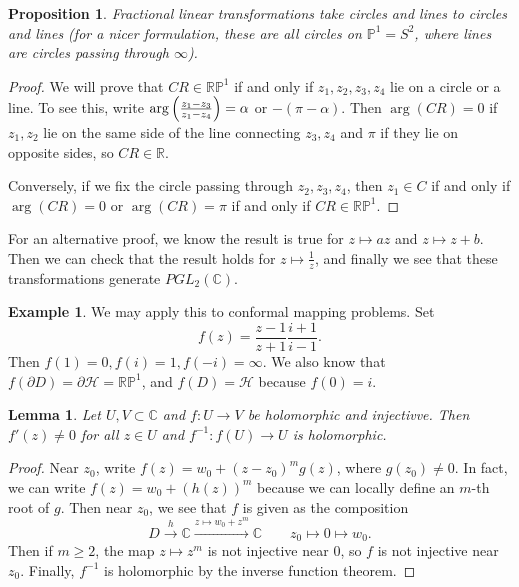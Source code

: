 \documentclass[leqno, openany]{memoir}
\newtheorem{prop}[thm]{Proposition}
\newtheorem{lem}[thm]{Lemma}
\theoremstyle{definition}
\newtheorem{exm}[thm]{Example}
\theoremstyle{remark}
\theoremstyle{plain}
\theoremstyle{definition}
\theoremstyle{remark}
\newcommand{\R}{\mathbb{R}}
\newcommand{\C}{\mathbb{C}}
\renewcommand{\P}{\mathbb{P}}
\newcommand{\mc}[1]{\mathcal{#1}}
\begin{document}
\begin{prop}
    Fractional linear transformations take circles and lines to circles and lines (for a nicer formulation, these are all circles on $\P^1 = S^2$, where lines are circles passing through $\infty$).
\end{prop}

\begin{proof}
    We will prove that $CR \in \R \P^1$ if and only if $z_1, z_2, z_3, z_4$ lie on a circle or a line. To see this, write $\arg\qty(\frac{z_1-z_3}{z_1-z_4}) = \alpha$ or $-(\pi-\alpha)$. Then $\arg(CR) = 0$ if $z_1, z_2$ lie on the same side of the line connecting $z_3, z_4$ and $\pi$ if they lie on opposite sides, so $CR \in \R$. 

    Conversely, if we fix the circle passing through $z_2, z_3, z_4$, then $z_1 \in C$ if and only if $\arg(CR) = 0$ or $\arg(CR) = \pi$ if and only if $CR \in \R\P^1$.
\end{proof}

For an alternative proof, we know the result is true for $z \mapsto az$ and $z \mapsto z + b$. Then we can check that the result holds for $z \mapsto \frac{1}{z}$, and finally we see that these transformations generate $PGL_2(\C)$.

\begin{exm}
    We may apply this to conformal mapping problems. Set 
    \[ f(z) = \frac{z-1}{z+1} \frac{i+1}{i-1}. \]
    Then $f(1) = 0, f(i) = 1, f(-i) = \infty$. We also know that $f(\partial D) = \partial \mc{H} = \R\P^1$, and $f(D) = \mc{H}$ because $f(0) = i$.
\end{exm}

\begin{lem}
    Let $U, V \subset \C$ and $f \colon U \to V$ be holomorphic and injectivve. Then $f'(z) \neq 0$ for all $z \in U$ and $f^{-1} \colon f(U) \to U$ is holomorphic.
\end{lem}

\begin{proof}
    Near $z_0$, write $f(z) = w_0 + {(z-z_0)}^m g(z)$, where $g(z_0) \neq 0$. In fact, we can write $f(z) = w_0 + {(h(z))}^m$ because we can locally define an $m$-th root of $g$. Then near $z_0$, we see that $f$ is given as the composition
    \[ D \xrightarrow{h} \C \xrightarrow{z \mapsto w_0 + z^m} \C \qquad z_0 \mapsto 0 \mapsto w_0. \]
    Then if $m \geq 2$, the map $z \mapsto z^m$ is not injective near $0$, so $f$ is not injective near $z_0$. Finally, $f^{-1}$ is holomorphic by the inverse function theorem.
\end{proof}
\end{document}
